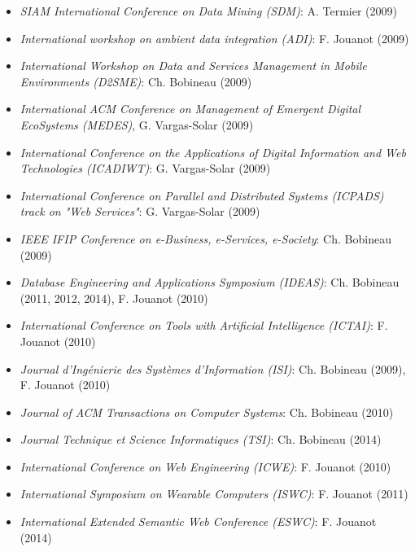 \begin{itemize}
\item {\it SIAM International Conference on Data Mining (SDM)}: A. Termier (2009)

\item {\it International workshop on ambient data integration (ADI)}: F. Jouanot (2009)

\item {\it International Workshop on Data and Services Management in Mobile Environments (D2SME)}: Ch. Bobineau (2009)

\item {\it International ACM Conference on Management of Emergent Digital EcoSystems (MEDES)}, G. Vargas-Solar (2009)

\item {\it International Conference on the Applications of Digital Information and Web Technologies (ICADIWT)}: G. Vargas-Solar (2009)

\item {\it International Conference on Parallel and Distributed Systems (ICPADS) track on "Web Services"}: G. Vargas-Solar (2009)

\item {\it IEEE IFIP Conference on e-Business, e-Services, e-Society}: Ch. Bobineau (2009)

\item {\it Database Engineering and Applications Symposium (IDEAS)}: Ch. Bobineau (2011, 2012, 2014), F. Jouanot (2010)

\item {\it International Conference on Tools with Artificial Intelligence (ICTAI)}: F. Jouanot (2010)

\item {\it Journal d'Ing{\'e}nierie des Syst{\`e}mes d'Information (ISI)}: Ch. Bobineau (2009), F. Jouanot (2010)

\item {\it Journal of ACM Transactions on Computer Systems}: Ch. Bobineau (2010)

\item {\it Journal Technique et Science Informatiques (TSI)}: Ch. Bobineau (2014)

\item {\it International Conference on Web Engineering (ICWE)}: F. Jouanot (2010)

\item {\it International Symposium on Wearable Computers (ISWC)}: F. Jouanot (2011)

\item {\it International Extended Semantic Web Conference (ESWC)}: F. Jouanot (2014)


\end{itemize}
